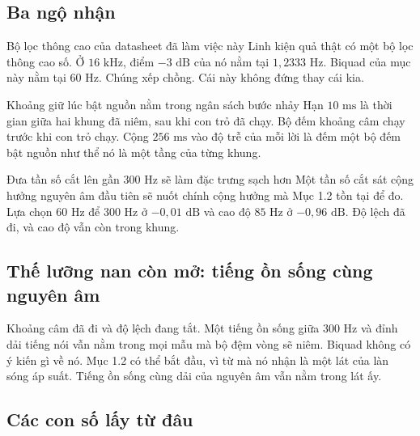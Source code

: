 \documentclass[11pt,a4paper]{article}
\begin{document}
\subsection*{Ba ngộ nhận}

\begin{misconceptionbox}{Bộ lọc thông cao của datasheet đã làm việc này}
Linh kiện quả thật có một bộ lọc thông cao số. Ở $16\text{ kHz}$, điểm $-3\text{ dB}$ của nó nằm tại $1{,}2333\text{ Hz}$. Biquad của mục này nằm tại $60\text{ Hz}$. Chúng xếp chồng. Cái này không đứng thay cái kia.
\end{misconceptionbox}

\begin{misconceptionbox}{Khoảng giữ lúc bật nguồn nằm trong ngân sách bước nhảy}
Hạn $10\text{ ms}$ là thời gian giữa hai khung đã niêm, sau khi con trỏ đã chạy. Bộ đếm khoảng câm chạy trước khi con trỏ chạy. Cộng $256\text{ ms}$ vào độ trễ của mỗi lời là đếm một bộ đếm bật nguồn như thể nó là một tầng của từng khung.
\end{misconceptionbox}

\begin{misconceptionbox}{Đưa tần số cắt lên gần $300\text{ Hz}$ sẽ làm đặc trưng sạch hơn}
Một tần số cắt sát cộng hưởng nguyên âm đầu tiên sẽ nuốt chính cộng hưởng mà Mục 1.2 tồn tại để đo. Lựa chọn $60\text{ Hz}$ để $300\text{ Hz}$ ở $-0{,}01\text{ dB}$ và cao độ $85\text{ Hz}$ ở $-0{,}96\text{ dB}$. Độ lệch đã đi, và cao độ vẫn còn trong khung.
\end{misconceptionbox}

\subsection*{Thế lưỡng nan còn mở: tiếng ồn sống cùng nguyên âm}

Khoảng câm đã đi và độ lệch đang tắt. Một tiếng ồn sống giữa $300\text{ Hz}$ và đỉnh dải tiếng nói vẫn nằm trong mọi mẫu mà bộ đệm vòng sẽ niêm. Biquad không có ý kiến gì về nó. Mục 1.2 có thể bắt đầu, vì từ mà nó nhận là một lát của làn sóng áp suất. Tiếng ồn sống cùng dải của nguyên âm vẫn nằm trong lát ấy.

\subsection*{Các con số lấy từ đâu}
\end{document}
